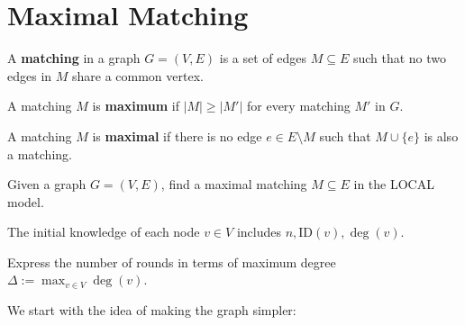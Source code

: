\chapter{Maximal Matching}

\begin{definition}
    A \textbf{matching} in a graph \( G = (V, E) \) is a set of edges \( M \subseteq E \) such that no two edges in \( M \) share a common vertex.
    
    A matching $M$ is \textbf{maximum} if $|M| \geq |M'|$ for every matching $M'$ in $G$.

    A matching $M$ is \textbf{maximal} if there is no edge $e \in E \setminus M$ such that $M \cup \{e\}$ is also a matching.
\end{definition}

\begin{question}
    Given a graph \( G = (V, E) \), find a maximal matching \( M \subseteq E \) in the LOCAL model.

  The initial knowledge of each node \( v \in V \) includes $n, \text{ID}(v), \deg(v)$.

    Express the number of rounds in terms of maximum degree $\Delta := \max_{v \in V} \deg(v)$.
\end{question}

We start with the idea of making the graph simpler:

